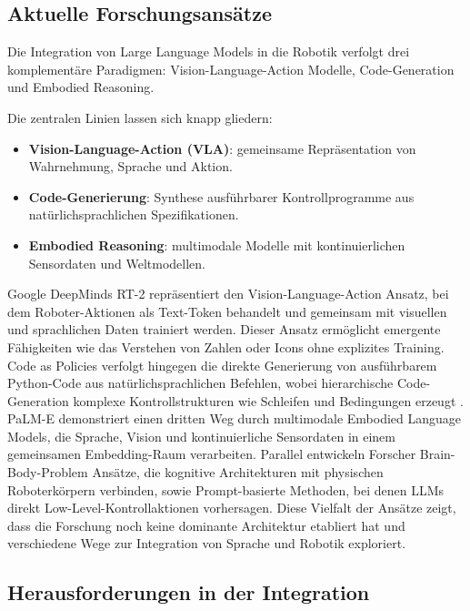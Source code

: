 \subsection{Aktuelle Forschungsansätze}

Die Integration von Large Language Models in die Robotik verfolgt drei
komplementäre Paradigmen: Vision-Language-Action Modelle, Code-Generation und
Embodied Reasoning.

\noindent Die zentralen Linien lassen sich knapp gliedern:
\begin{itemize}
	\item \textbf{Vision-Language-Action (VLA)}: gemeinsame Repräsentation von Wahrnehmung, Sprache und Aktion.
	\item \textbf{Code-Generierung}: Synthese ausführbarer Kontrollprogramme aus natürlichsprachlichen Spezifikationen.
	\item \textbf{Embodied Reasoning}: multimodale Modelle mit kontinuierlichen Sensordaten und Weltmodellen.
\end{itemize}

Google DeepMinds RT-2 repräsentiert den Vision-Language-Action Ansatz, bei dem
Roboter-Aktionen als Text-Token behandelt und gemeinsam mit visuellen und
sprachlichen Daten trainiert werden. Dieser Ansatz ermöglicht emergente
Fähigkeiten wie das Verstehen von Zahlen oder Icons ohne explizites
Training. Code as Policies verfolgt hingegen die
direkte Generierung von ausführbarem Python-Code aus natürlichsprachlichen
Befehlen, wobei hierarchische Code-Generation komplexe Kontrollstrukturen wie
Schleifen und Bedingungen erzeugt . PaLM-E
demonstriert einen dritten Weg durch multimodale Embodied Language Models, die
Sprache, Vision und kontinuierliche Sensordaten in einem gemeinsamen
Embedding-Raum verarbeiten. Parallel entwickeln
Forscher Brain-Body-Problem Ansätze, die kognitive Architekturen mit physischen
Roboterkörpern verbinden, sowie Prompt-basierte Methoden, bei denen LLMs direkt
Low-Level-Kontrollaktionen vorhersagen. Diese Vielfalt der Ansätze zeigt, dass die Forschung noch
keine dominante Architektur etabliert hat und
verschiedene Wege zur Integration von Sprache und Robotik exploriert.

\subsection{Herausforderungen in der Integration}

